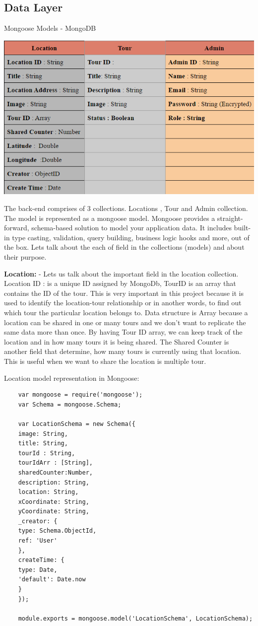 		\subsection{Data Layer}
			Mongoose Models - MongoDB
		\begin {center}    
		\includegraphics{img/dataModels.PNG}
		\end{center}
		The back-end comprises of 3 collections. Locations , Tour and Admin collection. The model is represented as a mongoose model. Mongoose provides a straight-forward, schema-based solution to model your application data. It includes built-in type casting, validation, query building, business logic hooks and more, out of the box. Lets talk about the each of  field in the collections (models) and about their purpose. 
		
		\textbf	{Location:} - Lets us talk about the important field in the location collection. Location ID : is a unique ID assigned by MongoDb, TourID is an array that contains the ID of the tour. This is very important in this project because it is used to identify the location-tour relationship or in another words, to find out which tour the particular location belongs to. Data structure is Array because a location can be shared in one or many tours and we don't want to replicate the same data more than once. By having Tour ID array, we can keep track of the location and in how many tours it is being shared.
		The Shared Counter is another field that determine, how many tours is currently using that location. This is useful when we want to share the location is multiple tour. 
		
		Location model representation in Mongoose:
	\begin{verbatim}
	var mongoose = require('mongoose');
	var Schema = mongoose.Schema;
	
	var LocationSchema = new Schema({
	image: String,
	title: String,
	tourId : String,
	tourIdArr : [String],
	sharedCounter:Number,
	description: String,
	location: String,
	xCoordinate: String,
	yCoordinate: String,
	_creator: {
	type: Schema.ObjectId,
	ref: 'User'
	},
	createTime: {
	type: Date,
	'default': Date.now
	}
	});
	
	module.exports = mongoose.model('LocationSchema', LocationSchema);
		
	\end{verbatim}
		
